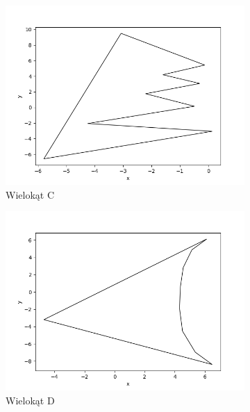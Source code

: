 \documentclass[11pt,a4paper]{article}
\begin{document}
\begin{figure}[H]
\begin{subfigure}[b]{0.46\textwidth}
        \includegraphics[scale=0.4]{res/pol_c.png}
        \caption{
            Wielokąt C
        }
    \end{subfigure}
    \begin{subfigure}[b]{0.46\textwidth}
        \centering
        \includegraphics[scale=0.4]{res/pol_d.png}
        \caption{
            Wielokąt D
        }
    \end{subfigure}
    \begin{subfigure}[b]{0.46\textwidth}
        \centering

\end{subfigure}
\end{figure}
\end{document}
